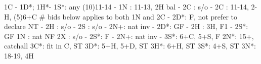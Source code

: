 1C - 1D*; 1H*-
1S*: any (10)11-14
   - 1N : 11-13, 2H bal
        - 2C : s/o
   - 2C : 11-14, 2-H, (5)6+C
   # bids below applies to both 1N and 2C
        - 2D*: F, not prefer to declare NT
        - 2H : s/o
        - 2S : s/o
        - 2N+: nat inv
   - 2D*: GF
   - 2H : 3H, F1
   - 2S*: GF
1N : nat NF
2X : s/o
   - 2S*: F
   - 2N+: nat inv
   - 3S*: 6+C, 5+S, F
2N*: 15+, catchall
3C*: fit in C, ST
3D*: 5+H, 5+D, ST
3H*: 6+H, ST
3S*: 4+S, ST
3N*: 18-19, 4H
